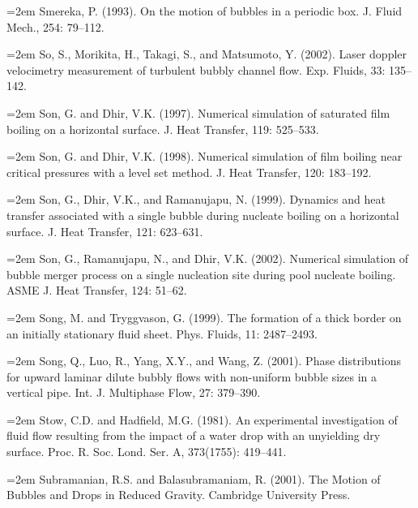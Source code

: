 \documentclass[11pt,a4paper,openany,fontset=none]{ctexbook}
\begin{document}
\par\hangindent=2em Smereka, P. (1993). On the motion of bubbles in a periodic box. J. Fluid Mech., 254: 79--112.

\par\hangindent=2em So, S., Morikita, H., Takagi, S., and Matsumoto, Y. (2002). Laser doppler velocimetry measurement of turbulent bubbly channel flow. Exp. Fluids, 33: 135-- 142.

\par\hangindent=2em Son, G. and Dhir, V.K. (1997). Numerical simulation of saturated film boiling on a horizontal surface. J. Heat Transfer, 119: 525--533.

\par\hangindent=2em Son, G. and Dhir, V.K. (1998). Numerical simulation of film boiling near critical pressures with a level set method. J. Heat Transfer, 120: 183--192.

\par\hangindent=2em Son, G., Dhir, V.K., and Ramanujapu, N. (1999). Dynamics and heat transfer associated with a single bubble during nucleate boiling on a horizontal surface. J. Heat Transfer, 121: 623--631.

\par\hangindent=2em Son, G., Ramanujapu, N., and Dhir, V.K. (2002). Numerical simulation of bubble merger process on a single nucleation site during pool nucleate boiling. ASME J. Heat Transfer, 124: 51--62.

\par\hangindent=2em Song, M. and Tryggvason, G. (1999). The formation of a thick border on an initially stationary fluid sheet. Phys. Fluids, 11: 2487--2493.

\par\hangindent=2em Song, Q., Luo, R., Yang, X.Y., and Wang, Z. (2001). Phase distributions for upward laminar dilute bubbly flows with non-uniform bubble sizes in a vertical pipe. Int. J. Multiphase Flow, 27: 379--390.

\par\hangindent=2em Stow, C.D. and Hadfield, M.G. (1981). An experimental investigation of fluid flow resulting from the impact of a water drop with an unyielding dry surface. Proc. R. Soc. Lond. Ser. A, 373(1755): 419--441.

\par\hangindent=2em Subramanian, R.S. and Balasubramaniam, R. (2001). The Motion of Bubbles and Drops in Reduced Gravity. Cambridge University Press.
\end{document}

